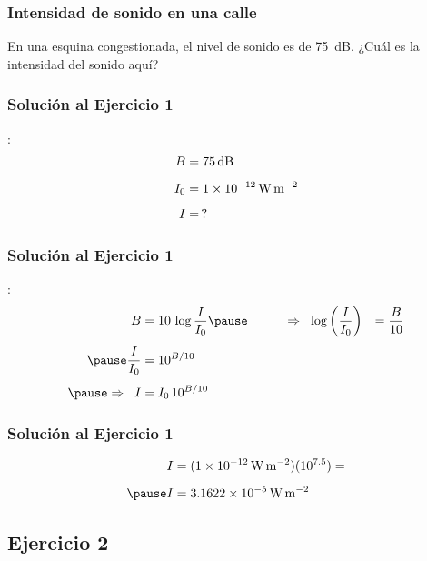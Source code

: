 \documentclass[14pt]{beamer}
\begin{document}
\begin{frame}
\frametitle{Intensidad de sonido en una calle}
En una esquina congestionada, el nivel de sonido es de \SI{75}{\dB}. ¿Cuál es la intensidad del sonido aquí?
\end{frame}
\begin{frame}
\frametitle{Solución al Ejercicio 1}
:
\pause
\begin{align*}
B &= \SI{75}{\dB} \\[0.5em]
I_{0} &= \SI{1d-12}{\watt\per\square\meter} \\[0.5em]
I &= \, ?
\end{align*}
\end{frame}
\begin{frame}
\frametitle{Solución al Ejercicio 1}
:
\pause
\begin{eqnarray*}
\begin{aligned}
B &= 10 \, \log \dfrac{I}{I_{0}} \pause \hspace{1cm} \Rightarrow \hspace*{0.2cm} \log \left( \dfrac{I}{I_{0}} \right) &= \dfrac{B}{10} \\[0.4em] \pause
\dfrac{I}{I_{0}} &= 10^{B/10} \\[0.4em] \pause
\Rightarrow \hspace*{0.2cm} I &= I_{0} \, 10^{B/10}
\end{aligned}
\end{eqnarray*}
\end{frame}
\begin{frame}
\frametitle{Solución al Ejercicio 1}
\pause
\begin{eqnarray*}
\begin{aligned}
I &= (\SI{1d-12}{\watt\per\square\meter})(10^{7.5}) = \\[0.5em] \pause
I &= \SI{3.1622d-5}{\watt\per\square\meter}
\end{aligned}
\end{eqnarray*}
\end{frame}

\subsection{Ejercicio 2}
\end{document}
